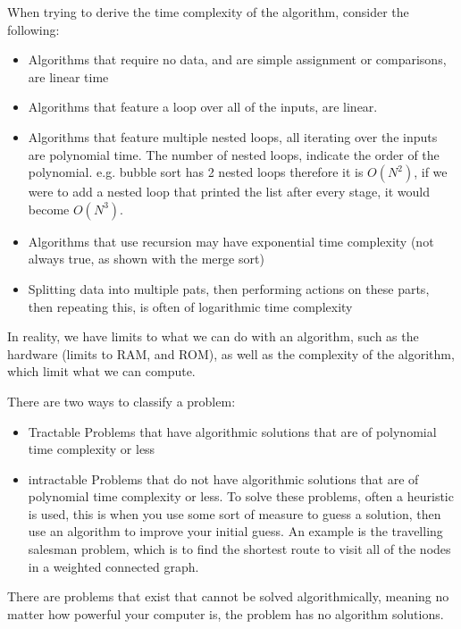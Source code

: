   When trying to derive the time complexity of the algorithm, consider the following:
  \begin{itemize}
  	\item Algorithms that require no data, and are simple assignment or comparisons, are linear time
  	\item Algorithms that feature a loop over all of the inputs, are linear.
  	\item Algorithms that feature multiple nested loops, all iterating over the inputs are polynomial time. The number of nested loops, indicate the order of the polynomial. e.g. bubble sort has 2 nested loops therefore it is $O(N^2)$, if we were to add a nested loop that printed the list after every stage, it would become $O(N^3)$.
  	\item Algorithms that use recursion may have exponential time complexity (not always true, as shown with the merge sort)
  	\item Splitting data into multiple pats, then performing actions on these parts, then repeating this, is often of logarithmic time complexity
  \end{itemize}
  
  \noindent
  In reality, we have limits to what we can do with an algorithm, such as the hardware (limits to RAM, and ROM), as well as the complexity of the algorithm, which limit what we can compute.
  
  \noindent
  There are two ways to classify a problem:
  \begin{itemize}
  	\item Tractable
	  	\subitem Problems that have algorithmic solutions that are of polynomial time complexity or less
  	\item intractable
	  	\subitem Problems that do not have algorithmic solutions that are of polynomial time complexity or less. To solve these problems, often a heuristic is used, this is when you use some sort of measure to guess a solution, then use an algorithm to improve your initial guess. An example is the travelling salesman problem, which is to find the shortest route to visit all of the nodes in a weighted connected graph.
  \end{itemize}
  
  \noindent
  There are problems that exist that cannot be solved algorithmically, meaning no matter how powerful your computer is, the problem has no algorithm solutions.
  
